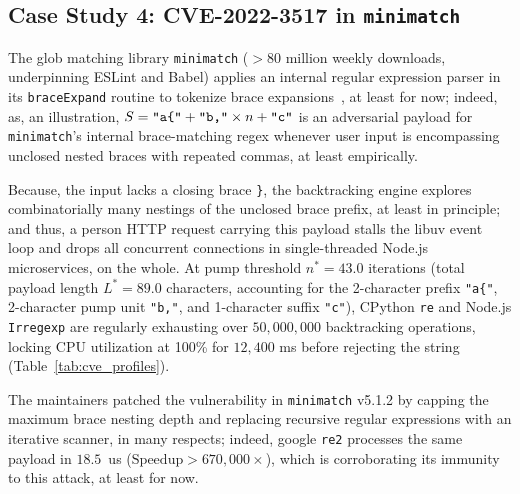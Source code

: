 \documentclass{ieeeaccess}
\begin{document}
\subsection{Case Study 4: CVE-2022-3517 in \texttt{minimatch}}
The glob matching library \texttt{minimatch} ($>80$ million weekly downloads, underpinning ESLint and Babel) applies an internal regular expression parser in its \texttt{braceExpand} routine to tokenize brace expansions~\cite{cve_2022_3517}, at least for now; indeed, as, an illustration, $S = \text{\texttt{"a\{"}} + \text{\texttt{"b,"}} \times n + \text{\texttt{"c"}}$ is an adversarial payload for \texttt{minimatch}'s internal brace-matching regex whenever user input is encompassing unclosed nested braces with repeated commas, at least empirically.

Because, the input lacks a closing brace \texttt{\}}, the backtracking engine explores combinatorially many nestings of the unclosed brace prefix, at least in principle; and thus, a person HTTP request carrying this payload stalls the libuv event loop and drops all concurrent connections in single-threaded Node.js microservices, on the whole. At pump threshold $n^* = 43.0$ iterations (total payload length $L^* = 89.0$ characters, accounting for the 2-character prefix \texttt{"a\{"}, 2-character pump unit \texttt{"b,"}, and 1-character suffix \texttt{"c"}), CPython \texttt{re} and Node.js \texttt{Irregexp} are regularly exhausting over $50{,}000{,}000$ backtracking operations, locking CPU utilization at 100\% for $12{,}400$ ms before rejecting the string (Table~\ref{tab:cve_profiles}).

The maintainers patched the vulnerability in \texttt{minimatch} v5.1.2 by capping the maximum brace nesting depth and replacing recursive regular expressions with an iterative scanner, in many respects; indeed, google \texttt{re2} processes the same payload in $18.5$~us ($\mathrm{Speedup} > 670{,}000\times$), which is corroborating its immunity to this attack, at least for now.
\end{document}
